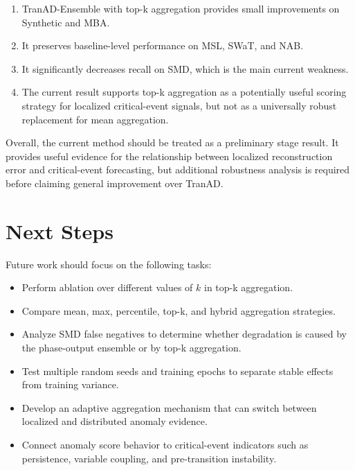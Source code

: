 \documentclass[a4paper,11pt]{article}
\begin{document}
\begin{enumerate}
    \item TranAD-Ensemble with top-k aggregation provides small improvements on Synthetic and MBA.
    \item It preserves baseline-level performance on MSL, SWaT, and NAB.
    \item It significantly decreases recall on SMD, which is the main current weakness.
    \item The current result supports top-k aggregation as a potentially useful scoring strategy for localized critical-event signals, but not as a universally robust replacement for mean aggregation.
\end{enumerate}

Overall, the current method should be treated as a preliminary stage result. It provides useful evidence for the relationship between localized reconstruction error and critical-event forecasting, but additional robustness analysis is required before claiming general improvement over TranAD.

\section{Next Steps}

Future work should focus on the following tasks:

\begin{itemize}
    \item Perform ablation over different values of $k$ in top-k aggregation.
    \item Compare mean, max, percentile, top-k, and hybrid aggregation strategies.
    \item Analyze SMD false negatives to determine whether degradation is caused by the phase-output ensemble or by top-k aggregation.
    \item Test multiple random seeds and training epochs to separate stable effects from training variance.
    \item Develop an adaptive aggregation mechanism that can switch between localized and distributed anomaly evidence.
    \item Connect anomaly score behavior to critical-event indicators such as persistence, variable coupling, and pre-transition instability.
\end{itemize}
\end{document}
